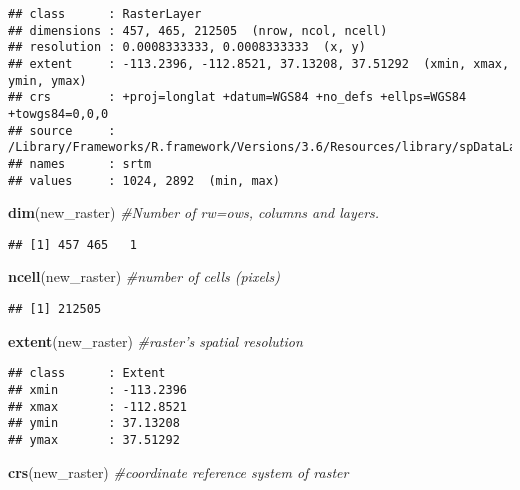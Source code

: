 \documentclass[]{article}
\newenvironment{Shaded}{\begin{snugshade}}{\end{snugshade}}
\newcommand{\CommentTok}[1]{\textcolor[rgb]{0.56,0.35,0.01}{\textit{#1}}}
\newcommand{\KeywordTok}[1]{\textcolor[rgb]{0.13,0.29,0.53}{\textbf{#1}}}
\newcommand{\NormalTok}[1]{#1}
\begin{document}
\begin{verbatim}
## class      : RasterLayer 
## dimensions : 457, 465, 212505  (nrow, ncol, ncell)
## resolution : 0.0008333333, 0.0008333333  (x, y)
## extent     : -113.2396, -112.8521, 37.13208, 37.51292  (xmin, xmax, ymin, ymax)
## crs        : +proj=longlat +datum=WGS84 +no_defs +ellps=WGS84 +towgs84=0,0,0 
## source     : /Library/Frameworks/R.framework/Versions/3.6/Resources/library/spDataLarge/raster/srtm.tif 
## names      : srtm 
## values     : 1024, 2892  (min, max)
\end{verbatim}

\begin{Shaded}
\begin{Highlighting}[]
\KeywordTok{dim}\NormalTok{(new_raster) }\CommentTok{#Number of rw=ows, columns and layers.}
\end{Highlighting}
\end{Shaded}

\begin{verbatim}
## [1] 457 465   1
\end{verbatim}

\begin{Shaded}
\begin{Highlighting}[]
\KeywordTok{ncell}\NormalTok{(new_raster) }\CommentTok{#number of cells (pixels)}
\end{Highlighting}
\end{Shaded}

\begin{verbatim}
## [1] 212505
\end{verbatim}

\begin{Shaded}
\begin{Highlighting}[]
\KeywordTok{extent}\NormalTok{(new_raster) }\CommentTok{#raster's spatial resolution}
\end{Highlighting}
\end{Shaded}

\begin{verbatim}
## class      : Extent 
## xmin       : -113.2396 
## xmax       : -112.8521 
## ymin       : 37.13208 
## ymax       : 37.51292
\end{verbatim}

\begin{Shaded}
\begin{Highlighting}[]
\KeywordTok{crs}\NormalTok{(new_raster) }\CommentTok{#coordinate reference system of raster}
\end{Highlighting}
\end{Shaded}
\end{document}
